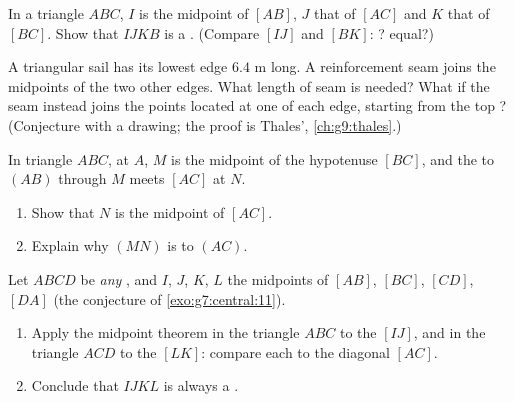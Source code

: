 \begin{exercise}[$\star\star$]\label{exo:g8:midpoints:6}
In a triangle $ABC$, $I$ is the midpoint of $[AB]$, $J$ that of
$[AC]$ and $K$ that of $[BC]$. Show that $IJKB$ is a .
(Compare $[IJ]$ and $[BK]$: ? equal?)
\end{exercise}

\begin{exercise}[$\star\star$]\label{exo:g8:midpoints:7}
A triangular sail has its lowest edge $6.4$ m long. A reinforcement
seam joins the midpoints of the two other edges. What length of seam
is needed? What if the seam instead joins the points located at one
 of each edge, starting from the top ? (Conjecture with
a drawing; the proof is Thales', \cref{ch:g9:thales}.)
\end{exercise}

\begin{exercise}[$\star\star$]\label{exo:g8:midpoints:8}
In triangle $ABC$,  at $A$, $M$ is the midpoint of the
hypotenuse $[BC]$, and the  to $(AB)$ through $M$ meets
$[AC]$ at $N$.
\begin{enumerate}
  \item Show that $N$ is the midpoint of $[AC]$.
  \item Explain why $(MN)$ is  to $(AC)$.
\end{enumerate}
\end{exercise}

\begin{exercise}[$\star\star\star$]\label{exo:g8:midpoints:9}
Let $ABCD$ be \emph{any} , and $I$, $J$, $K$, $L$ the
midpoints of $[AB]$, $[BC]$, $[CD]$, $[DA]$ (the conjecture of
\cref{exo:g7:central:11}).
\begin{enumerate}
  \item Apply the midpoint theorem in the triangle $ABC$ to the
         $[IJ]$, and in the triangle $ACD$ to the 
        $[LK]$: compare each to the diagonal $[AC]$.
  \item Conclude that $IJKL$ is always a .
\end{enumerate}
\end{exercise}


